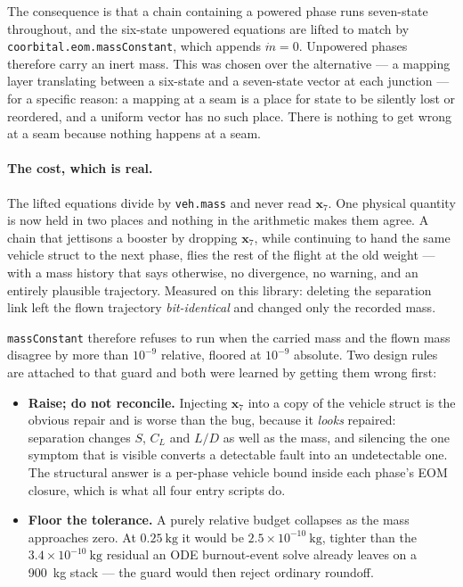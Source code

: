 \documentclass[11pt]{article}
\newcommand{\code}[1]{\texttt{#1}}
\begin{document}
The consequence is that a chain containing a powered phase runs seven-state
throughout, and the six-state unpowered equations are lifted to match by
\code{coorbital.eom.massConstant}, which appends $\dot m = 0$. Unpowered phases
therefore carry an inert mass. This was chosen over the alternative --- a
mapping layer translating between a six-state and a seven-state vector at each
junction --- for a specific reason: a mapping at a seam is a place for state to
be silently lost or reordered, and a uniform vector has no such place. There is
nothing to get wrong at a seam because nothing happens at a seam.

\paragraph{The cost, which is real.} The lifted equations divide by
\code{veh.mass} and never read $\mathbf{x}_7$. One physical quantity is now
held in two places and nothing in the arithmetic makes them agree. A chain that
jettisons a booster by dropping $\mathbf{x}_7$, while continuing to hand the
same vehicle struct to the next phase, flies the rest of the flight at the old
weight --- with a mass history that says otherwise, no divergence, no warning,
and an entirely plausible trajectory. Measured on this library: deleting the
separation link left the flown trajectory \emph{bit-identical} and changed only
the recorded mass.

\code{massConstant} therefore refuses to run when the carried mass and the
flown mass disagree by more than $10^{-9}$ relative, floored at $10^{-9}$
absolute. Two design rules are attached to that guard and both were learned by
getting them wrong first:
\begin{itemize}
\item \textbf{Raise; do not reconcile.} Injecting $\mathbf{x}_7$ into a copy of
the vehicle struct is the obvious repair and is worse than the bug, because it
\emph{looks} repaired: separation changes $S$, $C_L$ and $L/D$ as well as the
mass, and silencing the one symptom that is visible converts a detectable fault
into an undetectable one. The structural answer is a per-phase vehicle bound
inside each phase's EOM closure, which is what all four entry scripts do.
\item \textbf{Floor the tolerance.} A purely relative budget collapses as the
mass approaches zero. At $0.25~\mathrm{kg}$ it would be
$2.5\times10^{-10}~\mathrm{kg}$, tighter than the
$3.4\times10^{-10}~\mathrm{kg}$ residual an ODE burnout-event solve already
leaves on a 900~kg stack --- the guard would then reject ordinary roundoff.
\end{itemize}
\end{document}
